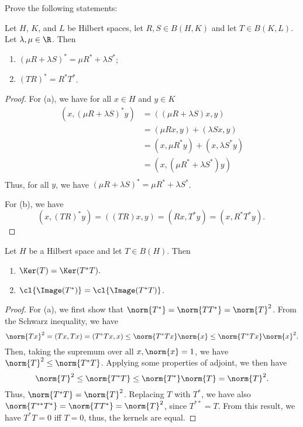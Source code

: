 \documentclass[12pt,letterpaper,twoside]{hmcpset}
\begin{document}
\noindent Prove the following statements:

\begin{problem}[1]
  Let $H$, $K$, and $L$ be Hilbert spaces, let $R,S \in B(H,K)$ and let $T \in B(K,L)$. Let $\lambda, \mu \in \R$.
  Then
  \begin{enumerate}[label=(\alph*)]
  \item $(\mu R + \lambda S)^* = \mu R^* + \lambda S^*$;
  \item $(TR)^* = R^*T^*$.
  
  \end{enumerate}
\end{problem}

\begin{solution}
  \begin{proof}
    For (a), we have for all $x \in H$ and $y \in K$
    \begin{align*}
      (x,(\mu R + \lambda S)^* y) &= ((\mu R + \lambda S) x, y) \\
      {} &= (\mu Rx, y) + (\lambda Sx, y) \\
      {} &= (x, \mu R^* y) + (x, \lambda S^* y) \\
      {} &= (x, (\mu R^* + \lambda S^*) y )\\
    \end{align*}
    Thus, for all $y$, we have $(\mu R + \lambda S)^* = \mu R^* + \lambda S^*$.

    For (b), we have \[
    (x,(TR)^* y) = ((TR)x, y) = (Rx, T^*y) = (x, R^*T^*y).\
    \]

  \end{proof}
\end{solution}

\begin{problem}[2]
  Let $H$ be a Hilbert space and let $T \in B(H)$. Then
  \begin{enumerate}[label=(\alph*)]
  \item $\Ker(T) = \Ker(T^*T).$
  \item $\cl{\Image(T^*)} = \cl{\Image(T^*T)}$.
  \end{enumerate}
\end{problem}

\begin{solution}
  \begin{proof}
    \label{prf:1}
    For (a), we first show that $\norm{T^*} = \norm{TT^*} = \norm{T}^2$.
    From the Schwarz inequality, we have \[
    \norm{Tx}^2 = (Tx, Tx) = (T^*Tx, x) \leq \norm{T^*Tx}\norm{x} \leq \norm{T^*Tx}\norm{x}^2. 
    \]
    Then, taking the supremum over all $x, \norm{x} = 1$, we have $\norm{T}^2 \leq \norm{T^*T}$.
    Applying some properties of adjoint, we then have \[
    \norm{T}^2 \leq \norm{T^*T} \leq \norm{T^*}\norm{T} = \norm{T}^2.
    \]
    Thus, $\norm{T^*T} = \norm{T}^2$. 
    Replacing $T$ with $T^*$, we have also $\norm{T^{**}T^*} = \norm{TT^*} = \norm{T}^2$, since $T^{**} = T$.
    From this result, we have $T^*T = 0$ iff $T = 0$, thus, the kernels are equal.
  \end{proof}
\end{solution}
\end{document}
